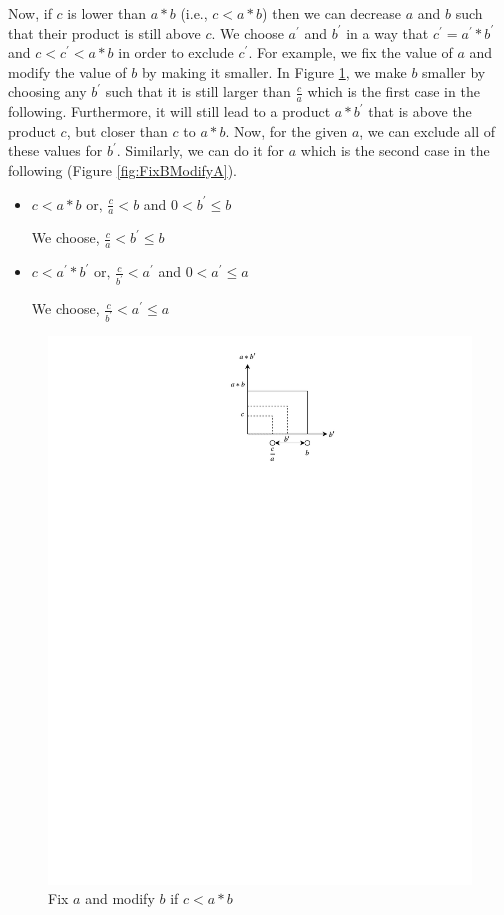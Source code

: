 \noindent Now, if $c$ is lower than $a \ast b$ (i.e., $c < a \ast b$) then we can decrease $a$ and $b$ such that their product is still above $c$.
We choose $a^\prime$ and $b^\prime$ in a way that $c^\prime = a^\prime \ast b^\prime$ and $c < c^\prime < a \ast b$ in order to exclude $c^\prime$.
For example, we fix the value of $a$ and modify the value of $b$ by making it smaller.
In Figure \ref{fig:FixAModifyB}, we make $b$ smaller by choosing any $b^\prime$ such that it is still larger than $\frac{c}{a}$ which is the first case in the following.
Furthermore, it will still lead to a product $a \ast b^\prime$ that is above the product $c$, but closer than $c$ to $a \ast b$.
Now, for the given $a$, we can exclude all of these values for $b^\prime$.
Similarly, we can do it for $a$ which is the second case in the following (Figure \ref{fig:FixBModifyA}).\newline


\begin{itemize}
    \item $c < a \ast b \text{ or, } \frac{c}{a} < b$ and $0 < b^\prime \leq b$\newline
    
    We choose, $\frac{c}{a} < b^\prime \leq b$
     \item $c < a^\prime \ast b^\prime \text{ or, } \frac{c}{b^\prime} < a^\prime$ and $0 < a^\prime \leq a$\newline
     
     We choose, $\frac{c}{b^\prime} < a^\prime \leq a$
\end{itemize}

\begin{figure}[ht!]
  \centering
  \includegraphics[width=0.5\linewidth]{./figures/ICP1_1.pdf}
  \caption{Fix $a$ and modify $b$ if $c < a \ast b$}
  \label{fig:FixAModifyB}
\end{figure}

